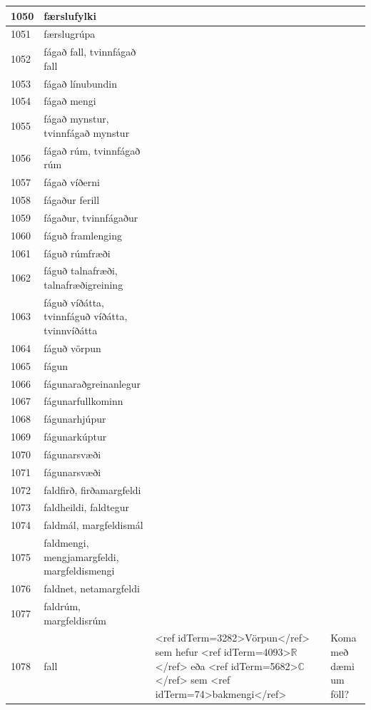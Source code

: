 \begin{longtable}{p{}|p{}|p{}|p{}|p{}}
\hline
1050 & færslufylki &  &  &  \\
\hline
1051 & færslugrúpa &  &  &  \\
\hline
1052 & fágað fall, tvinnfágað fall &  &  &  \\
\hline
1053 & fágað línubundin &  &  &  \\
\hline
1054 & fágað mengi &  &  &  \\
\hline
1055 & fágað mynstur, tvinnfágað mynstur &  &  &  \\
\hline
1056 & fágað rúm, tvinnfágað rúm &  &  &  \\
\hline
1057 & fágað víðerni &  &  &  \\
\hline
1058 & fágaður ferill &  &  &  \\
\hline
1059 & fágaður, tvinnfágaður &  &  &  \\
\hline
1060 & fáguð framlenging &  &  &  \\
\hline
1061 & fáguð rúmfræði &  &  &  \\
\hline
1062 & fáguð talnafræði, talnafræðigreining &  &  &  \\
\hline
1063 & fáguð víðátta, tvinnfáguð víðátta, tvinnvíðátta &  &  &  \\
\hline
1064 & fáguð vörpun &  &  &  \\
\hline
1065 & fágun &  &  &  \\
\hline
1066 & fágunaraðgreinanlegur &  &  &  \\
\hline
1067 & fágunarfullkominn &  &  &  \\
\hline
1068 & fágunarhjúpur &  &  &  \\
\hline
1069 & fágunarkúptur &  &  &  \\
\hline
1070 & fágunarsvæði &  &  &  \\
\hline
1071 & fágunarsvæði &  &  &  \\
\hline
1072 & faldfirð, firðamargfeldi &  &  &  \\
\hline
1073 & faldheildi, faldtegur &  &  &  \\
\hline
1074 & faldmál, margfeldismál &  &  &  \\
\hline
1075 & faldmengi, mengjamargfeldi, margfeldismengi & &  & \\
\hline
1076 & faldnet, netamargfeldi &  &  &  \\
\hline
1077 & faldrúm, margfeldisrúm &  &  &  \\
\hline
1078 & fall & <ref idTerm=3282>Vörpun</ref> sem hefur <ref idTerm=4093>$\mathbb{R}$</ref> eða <ref idTerm=5682>$\mathbb{C}$</ref> sem <ref idTerm=74>bakmengi</ref> &  & Koma með dæmi um föll? \\

\end{longtable}
